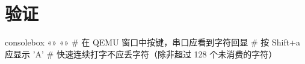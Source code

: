 \section{验证}

\begin{tcblisting}{consolebox}
«\tps{\$}» «»
# 在 QEMU 窗口中按键，串口应看到字符回显
# 按 Shift+a 应显示 'A'
# 快速连续打字不应丢字符（除非超过 128 个未消费的字符）
\end{tcblisting}


